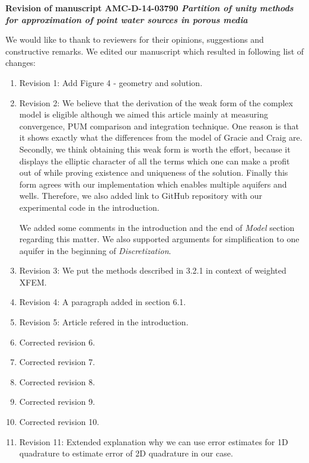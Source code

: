 \documentclass[a4paper,11pt]{article}
\begin{document}
{
\begin{center}
{\Large\bf Revision of manuscript AMC-D-14-03790 
\newline
\newline
\emph{Partition of unity methods for approximation of point water sources in porous media}}
\end{center}
}

We would like to thank to reviewers for their opinions, suggestions and constructive remarks.
We edited our manuscript which resulted in following list of changes:

\begin{enumerate}
\item Revision 1: Add Figure 4 - geometry and solution. %
\item Revision 2: %
      We believe that the derivation of the weak form of the complex model is eligible
      although we aimed this article mainly at measuring convergence, PUM comparison and integration technique.
      One reason is that it shows exactly what the differences from the model of Gracie and Craig are.
      Secondly, we think obtaining this weak form is worth the effort, because it displays the elliptic
      character of all the terms which one can make a profit out of while proving existence and uniqueness of the solution.
      Finally this form agrees with our implementation which enables multiple aquifers and wells.
      Therefore, we also added link to GitHub repository with our experimental code in the introduction.
      
      We added some comments in the introduction and the end of \emph{Model} section regarding this matter.
      We also supported arguments for simplification to one aquifer in the beginning of \emph{Discretization}.
\item Revision 3: We put the methods described in 3.2.1 in context of weighted XFEM.%
\item Revision 4: A paragraph added in section 6.1.%
\item Revision 5: Article refered in the introduction. %

\item Corrected revision 6. %
\item Corrected revision 7. %
\item Corrected revision 8. %
\item Corrected revision 9. %
\item Corrected revision 10. %

\item Revision 11: Extended explanation why we can use error estimates for 1D quadrature to estimate error of 2D quadrature in our case. %


\end{enumerate}
\end{document}
